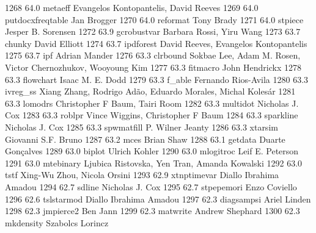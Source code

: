   1268     64.0    metaeff       Evangelos Kontopantelis, David Reeves   
  1269     64.0    putdocxfreqtable  Jan Brogger                             
  1270     64.0    reformat      Tony Brady                              
  1271     64.0    stpiece       Jesper B. Sorensen                      
  1272     63.9    gcrobustvar   Barbara Rossi, Yiru Wang                
  1273     63.7    chunky        David Elliott                           
  1274     63.7    ipdforest     David Reeves, Evangelos Kontopantelis   
  1275     63.7    ipf           Adrian Mander                           
  1276     63.3    clrbound      Sokbae Lee, Adam M. Rosen, Victor       
                                   Chernozhukov, Wooyoung Kim              
  1277     63.3    fitmacro      John Hendrickx                          
  1278     63.3    flowchart     Isaac M. E. Dodd                        
  1279     63.3    f_able        Fernando Rios-Avila                     
  1280     63.3    ivreg_ss      Xiang Zhang, Rodrigo Adão, Eduardo     
                                   Morales, Michal Kolesár                
  1281     63.3    lomodrs       Christopher F Baum, Tairi Room          
  1282     63.3    multidot      Nicholas J. Cox                         
  1283     63.3    roblpr        Vince Wiggins, Christopher F Baum       
  1284     63.3    sparkline     Nicholas J. Cox                         
  1285     63.3    spwmatfill    P. Wilner Jeanty                        
  1286     63.3    xtarsim       Giovanni S.F. Bruno                     
  1287     63.2    mces          Brian Shaw                              
  1288     63.1    getdata       Duarte Gonçalves                       
  1289     63.0    biplot        Ulrich Kohler                           
  1290     63.0    mlogitroc     Leif E. Peterson                        
  1291     63.0    mtebinary     Ljubica Ristovska, Yen Tran, Amanda     
                                   Kowalski                                
  1292     63.0    tstf          Xing-Wu Zhou, Nicola Orsini             
  1293     62.9    xtnptimevar   Diallo Ibrahima Amadou                  
  1294     62.7    sdline        Nicholas J. Cox                         
  1295     62.7    stpepemori    Enzo Coviello                           
  1296     62.6    tslstarmod    Diallo Ibrahima Amadou                  
  1297     62.3    diagsampsi    Ariel Linden                            
  1298     62.3    jmpierce2     Ben Jann                                
  1299     62.3    matwrite      Andrew Shephard                         
  1300     62.3    mkdensity     Szabolcs Lorincz                        

